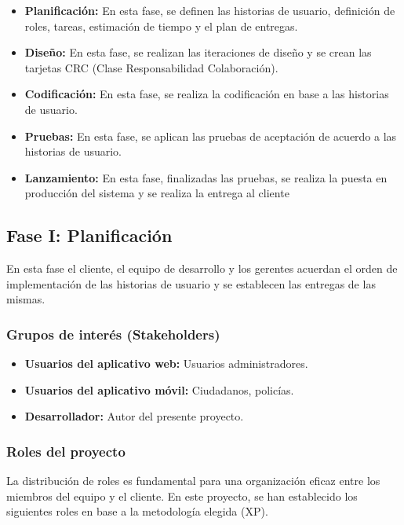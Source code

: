 \begin{itemize}
      \item \textbf{Planificación:} En esta fase, se definen las historias de usuario, definición de roles, tareas,
            estimación de tiempo y el plan de entregas.
      \item \textbf{Diseño:} En esta fase, se realizan las iteraciones de diseño y se crean las tarjetas CRC (Clase
            Responsabilidad Colaboración).
      \item \textbf{Codificación:} En esta fase, se realiza la codificación en base a las historias de usuario.
      \item \textbf{Pruebas:} En esta fase, se aplican las pruebas de aceptación de acuerdo a las historias de usuario.
      \item \textbf{Lanzamiento:} En esta fase, finalizadas las pruebas, se realiza la puesta en producción del sistema
            y se realiza la entrega al cliente
\end{itemize}

\subsection{Fase I: Planificación}
En esta fase el cliente, el equipo de desarrollo y los gerentes acuerdan el orden de implementación de las historias
de usuario y se establecen las entregas de las mismas.

\subsubsection{Grupos de interés (Stakeholders)}

\begin{itemize}
      \item \textbf{Usuarios del aplicativo web:} Usuarios administradores.
      \item \textbf{Usuarios del aplicativo móvil:} Ciudadanos, policías.
      \item \textbf{Desarrollador:} Autor del presente proyecto.
\end{itemize}

\subsubsection{Roles del proyecto}
La distribución de roles es fundamental para una organización eficaz entre los miembros del equipo y el cliente. En este
proyecto, se han establecido los siguientes roles en base a la metodología elegida (XP).

